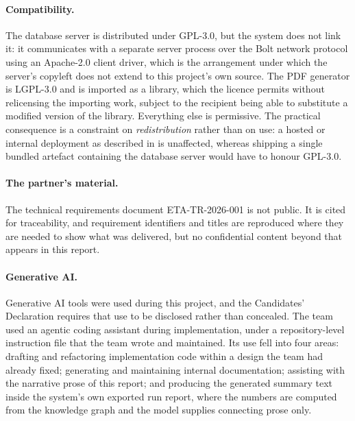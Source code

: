 \paragraph{Compatibility.} The database server is distributed under GPL-3.0,
but the system does not link it: it communicates with a separate server process
over the Bolt network protocol using an Apache-2.0 client driver, which is the
arrangement under which the server's copyleft does not extend to this
project's own source. The PDF generator is LGPL-3.0 and is imported as a
library, which the licence permits without relicensing the importing work,
subject to the recipient being able to substitute a modified version of the
library. Everything else is permissive. The practical consequence is a
constraint on \emph{redistribution} rather than on use: a hosted or internal
deployment as described in  is unaffected, whereas
shipping a single bundled artefact containing the database server would have to
honour GPL-3.0.


\paragraph{The partner's material.} The technical requirements document
ETA-TR-2026-001 is not public. It is cited for traceability, and requirement
identifiers and titles are reproduced where they are needed to show what was
delivered, but no confidential content beyond that appears in this report.

\paragraph{Generative AI.} Generative AI tools were used during this project,
and the Candidates' Declaration requires that use to be disclosed rather than
concealed. The team used an agentic coding assistant during implementation,
under a repository-level instruction file that the team wrote and maintained.
Its use fell into four areas: drafting and refactoring implementation code
within a design the team had already fixed; generating and maintaining internal
documentation; assisting with the narrative prose of this report; and producing
the generated summary text inside the system's own exported run report, where
the numbers are computed from the knowledge graph and the model supplies
connecting prose only.

